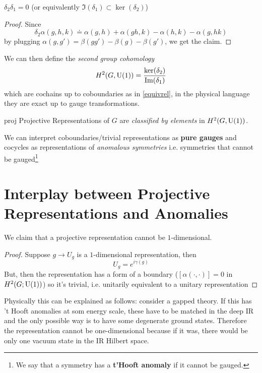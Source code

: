\begin{proposition}
    $\delta_2 \delta_1=0$ (or equivalently $\Im(\delta_1) \subset \ker(\delta_2)$)
\end{proposition}
\begin{proof}
    Since
\begin{equation}
    \delta_2 \alpha(g,h,k) \doteq \alpha(g,h) + \alpha(gh,k) - \alpha(h,k) -\alpha(g,hk)
\end{equation}
by plugging $\alpha(g,g') = \beta(gg') -\beta(g) -\beta(g')$, we get the claim.
\end{proof}
We can then define the \textit{second group cohomology}
\begin{equation}
    H^2(G, \U(1)) = \frac{\ker(\delta_2)}{\Im(\delta_1)}
\end{equation}
which are cochains up to coboundaries as in \eqref{equivrel}, in the physical language they are exact up to gauge transformations.\\

\begin{thm}{}{proj}
    Projective Representations of $G$ are \textit{classified by elements} in $ H^2(G, \mathrm{U}(1))$.
\end{thm}
We can interpret coboundaries/trivial representations as \textbf{pure gauges} and cocycles as representations of \textit{anomalous symmetries} i.e. symmetries that cannot be gauged\footnote{We say that a symmetry has a \textbf{t'Hooft anomaly} if it cannot be gauged.}


\section{Interplay between Projective Representations and Anomalies}
We claim that a projective representation cannot be $1$-dimensional.
\begin{proof}
    Suppose $g \to U_g$ is a $1$-dimensional representation, then
\begin{equation}
        U_g = e^{i \gamma(g)}
\end{equation}
But, then the representation has a form of a boundary ($[\alpha(\cdot, \cdot)] = 0 $ in $H^2(G; \mathrm{U}(1))$) so it's trivial, i.e. unitarily equivalent to a unitary representation
\end{proof}
Physically this can be explained as follows: consider a gapped theory. If this has 't Hooft anomalies at som energy scale, these have to be matched in the deep IR and the only possible way is to have some degenerate ground states. Therefore the representation cannot be one-dimensional because if it was, there would be only one vacuum state in the IR Hilbert space.

